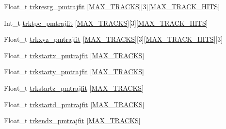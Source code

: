 \begin{DoxyCompactItemize}
\item 
Float\-\_\-t \hyperlink{classanatree_aed6abd04eb5db5adb7c2c1431885545b}{trkresrg\-\_\-pmtrajfit} \mbox{[}\hyperlink{anatree__core__v09410002__orig_8h_a327fd4e796e4a0d78947524c96e4362e}{M\-A\-X\-\_\-\-T\-R\-A\-C\-K\-S}\mbox{]}\mbox{[}3\mbox{]}\mbox{[}\hyperlink{anatree__core__v09410002__orig_8h_ae75eb9050f16aa034339f05572523070}{M\-A\-X\-\_\-\-T\-R\-A\-C\-K\-\_\-\-H\-I\-T\-S}\mbox{]}
\item 
Int\-\_\-t \hyperlink{classanatree_a992b438d7c09f5486fa6ff7bf2ef614f}{trktpc\-\_\-pmtrajfit} \mbox{[}\hyperlink{anatree__core__v09410002__orig_8h_a327fd4e796e4a0d78947524c96e4362e}{M\-A\-X\-\_\-\-T\-R\-A\-C\-K\-S}\mbox{]}\mbox{[}3\mbox{]}\mbox{[}\hyperlink{anatree__core__v09410002__orig_8h_ae75eb9050f16aa034339f05572523070}{M\-A\-X\-\_\-\-T\-R\-A\-C\-K\-\_\-\-H\-I\-T\-S}\mbox{]}
\item 
Float\-\_\-t \hyperlink{classanatree_aff289f04ed93258fc373d3971a9f539a}{trkxyz\-\_\-pmtrajfit} \mbox{[}\hyperlink{anatree__core__v09410002__orig_8h_a327fd4e796e4a0d78947524c96e4362e}{M\-A\-X\-\_\-\-T\-R\-A\-C\-K\-S}\mbox{]}\mbox{[}3\mbox{]}\mbox{[}\hyperlink{anatree__core__v09410002__orig_8h_ae75eb9050f16aa034339f05572523070}{M\-A\-X\-\_\-\-T\-R\-A\-C\-K\-\_\-\-H\-I\-T\-S}\mbox{]}\mbox{[}3\mbox{]}
\item 
Float\-\_\-t \hyperlink{classanatree_a1f9c28419a80caf6661ba03dbbbc2c34}{trkstartx\-\_\-pmtrajfit} \mbox{[}\hyperlink{anatree__core__v09410002__orig_8h_a327fd4e796e4a0d78947524c96e4362e}{M\-A\-X\-\_\-\-T\-R\-A\-C\-K\-S}\mbox{]}
\item 
Float\-\_\-t \hyperlink{classanatree_abc855e296a0eb442c8c73869566b1457}{trkstarty\-\_\-pmtrajfit} \mbox{[}\hyperlink{anatree__core__v09410002__orig_8h_a327fd4e796e4a0d78947524c96e4362e}{M\-A\-X\-\_\-\-T\-R\-A\-C\-K\-S}\mbox{]}
\item 
Float\-\_\-t \hyperlink{classanatree_ab28d2a3bbb24a7dbe738f5161fbea855}{trkstartz\-\_\-pmtrajfit} \mbox{[}\hyperlink{anatree__core__v09410002__orig_8h_a327fd4e796e4a0d78947524c96e4362e}{M\-A\-X\-\_\-\-T\-R\-A\-C\-K\-S}\mbox{]}
\item 
Float\-\_\-t \hyperlink{classanatree_a4db9bab6145a3340cba8a78149876c0d}{trkstartd\-\_\-pmtrajfit} \mbox{[}\hyperlink{anatree__core__v09410002__orig_8h_a327fd4e796e4a0d78947524c96e4362e}{M\-A\-X\-\_\-\-T\-R\-A\-C\-K\-S}\mbox{]}
\item 
Float\-\_\-t \hyperlink{classanatree_a78a9a7a0943eb654274a22a80ca28e32}{trkendx\-\_\-pmtrajfit} \mbox{[}\hyperlink{anatree__core__v09410002__orig_8h_a327fd4e796e4a0d78947524c96e4362e}{M\-A\-X\-\_\-\-T\-R\-A\-C\-K\-S}\mbox{]}

\end{DoxyCompactItemize}
